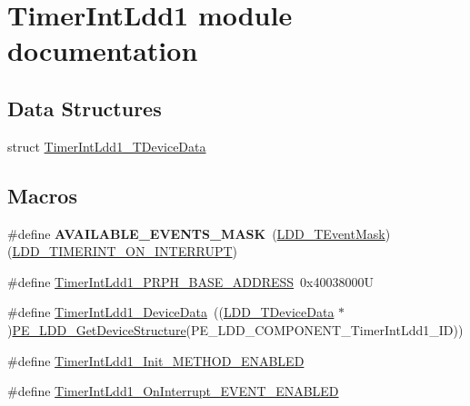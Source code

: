 \hypertarget{group___timer_int_ldd1__module}{}\section{Timer\+Int\+Ldd1 module documentation}
\label{group___timer_int_ldd1__module}
\subsection*{Data Structures}
\begin{DoxyCompactItemize}
\item 
struct \hyperlink{struct_timer_int_ldd1___t_device_data}{Timer\+Int\+Ldd1\+\_\+\+T\+Device\+Data}
\end{DoxyCompactItemize}
\subsection*{Macros}
\begin{DoxyCompactItemize}
\item 
\#define {\bfseries A\+V\+A\+I\+L\+A\+B\+L\+E\+\_\+\+E\+V\+E\+N\+T\+S\+\_\+\+M\+A\+SK}~(\hyperlink{group___p_e___types__module_gafbe7f4d4e51560399c3bdd0218584533}{L\+D\+D\+\_\+\+T\+Event\+Mask})(\hyperlink{group___p_e___types__module_gad4a95a8e3f3036e88f99c792431b4d72}{L\+D\+D\+\_\+\+T\+I\+M\+E\+R\+I\+N\+T\+\_\+\+O\+N\+\_\+\+I\+N\+T\+E\+R\+R\+U\+PT})\hypertarget{group___timer_int_ldd1__module_ga5f04a8830cd52a3ffa1678d113f31aee}{}\label{group___timer_int_ldd1__module_ga5f04a8830cd52a3ffa1678d113f31aee}

\item 
\#define \hyperlink{group___timer_int_ldd1__module_gafb6b69926d7c31c7571ad3d945251067}{Timer\+Int\+Ldd1\+\_\+\+P\+R\+P\+H\+\_\+\+B\+A\+S\+E\+\_\+\+A\+D\+D\+R\+E\+SS}~0x40038000U
\item 
\#define \hyperlink{group___timer_int_ldd1__module_ga5029b1a3ee62b1e77252cb5ee432e572}{Timer\+Int\+Ldd1\+\_\+\+Device\+Data}~((\hyperlink{group___p_e___types__module_gac5cf1362f1f0e3a2ce71b1bf2276d091}{L\+D\+D\+\_\+\+T\+Device\+Data} $\ast$)\hyperlink{group___p_e___types__module_gaa1c23d559daef5bcd3327ca83fb56f5a}{P\+E\+\_\+\+L\+D\+D\+\_\+\+Get\+Device\+Structure}(P\+E\+\_\+\+L\+D\+D\+\_\+\+C\+O\+M\+P\+O\+N\+E\+N\+T\+\_\+\+Timer\+Int\+Ldd1\+\_\+\+ID))
\item 
\#define \hyperlink{group___timer_int_ldd1__module_ga99f1a84b931818260bb4dfad5d071136}{Timer\+Int\+Ldd1\+\_\+\+Init\+\_\+\+M\+E\+T\+H\+O\+D\+\_\+\+E\+N\+A\+B\+L\+ED}
\item 
\#define \hyperlink{group___timer_int_ldd1__module_ga97ee83f24ca8c5f570d5be8bdc0c6dde}{Timer\+Int\+Ldd1\+\_\+\+On\+Interrupt\+\_\+\+E\+V\+E\+N\+T\+\_\+\+E\+N\+A\+B\+L\+ED}
\end{DoxyCompactItemize}
